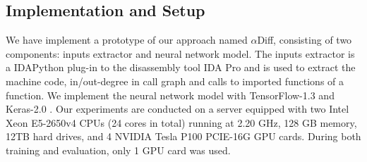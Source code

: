 \documentclass[10pt,conference]{IEEEtran}
\begin{document}
\subsection{Implementation and Setup}
We have implement a prototype of our approach named $\alpha$Diff, consisting of two
 components: inputs extractor and neural network model. 
The inputs extractor is a IDAPython \cite{idapython} plug-in to the disassembly tool
 IDA Pro \cite{idapro} and is used to extract the machine code, in/out-degree in call
  graph and calls to imported functions of a function. 
We implement the neural network model with TensorFlow-1.3 \cite{abadi2016tensorflow}
 and Keras-2.0 \cite{chollet2015keras}. 
Our experiments are conducted on a server equipped with two Intel Xeon E5-2650v4
 CPUs (24 cores in total) running at 2.20 GHz, 128 GB memory, 12TB hard drives,
  and 4 NVIDIA Tesla P100 PCIE-16G GPU cards. 
During both training and evaluation, only 1 GPU card was used.
\end{document}
